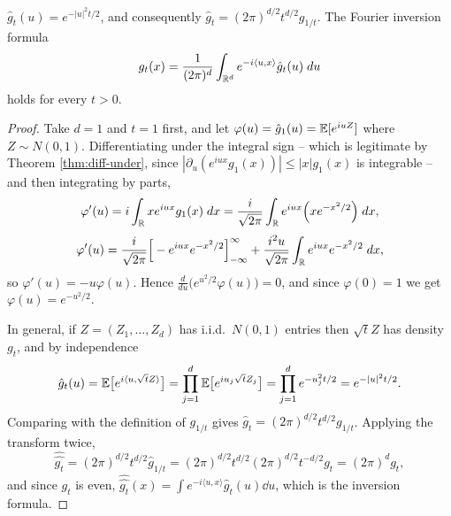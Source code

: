\documentclass[a4paper]{scrartcl}
\newcommand{\ip}[2]{\langle #1, #2 \rangle}
\begin{document}
\begin{proposition}\label{prop:gauss-ft}
	$\hat g_t(u) = e^{-|u|^2 t/2}$, and consequently $\hat g_t = (2\pi)^{d/2}t^{d/2}g_{1/t}$. The Fourier inversion formula
	$$
	g_t(x) = \frac{1}{(2\pi)^d}\int_{\R^d}e^{-i\ip{u}{x}}\hat g_t(u)\dd u
	$$
	holds for every $t>0$.
\end{proposition}
\begin{proof}
	Take $d=1$ and $t=1$ first, and let $\varphi(u)=\hat g_1(u)=\mathbb{E}[e^{iuZ}]$ where $Z \sim N(0,1)$. Differentiating under the integral sign -- which is legitimate by Theorem \ref{thm:diff-under}, since $|\partial_u(e^{iux}g_1(x))| \leq |x|g_1(x)$ is integrable -- and then integrating by parts,
	$$
	\varphi'(u) = i\int_{\mathbb{R}} x e^{iux}g_1(x)\; d x = \frac{i}{\sqrt{2\pi}}\int_{\mathbb{R}} e^{iux}\Big(x e^{-x^2/2}\Big)\; d x,
	$$
	$$
	\varphi'(u) = \frac{i}{\sqrt{2\pi}}\Big[ -e^{iux}e^{-x^2/2}\Big]_{-\infty}^\infty + \frac{i^2 u}{\sqrt{2\pi}}\int_{\mathbb{R}} e^{iux}e^{-x^2/2}\; d x,
	$$
	so $\varphi'(u)=-u\varphi(u)$. Hence $\frac{d}{du}\big(e^{u^2/2}\varphi(u)\big)=0$, and since $\varphi(0)=1$ we get $\varphi(u)=e^{-u^2/2}$.

	In general, if $Z=(Z_1,\dots,Z_d)$ has i.i.d.\ $N(0,1)$ entries then $\sqrt t Z$ has density $g_t$, and by independence
	$$
	\hat g_t(u) = \EE\big[e^{i\ip{u}{\sqrt tZ}}\big] = \prod_{j=1}^d\EE\big[e^{iu_j\sqrt t Z_j}\big]=\prod_{j=1}^d e^{-u_j^2t/2}=e^{-|u|^2t/2}.
	$$
	Comparing with the definition of $g_{1/t}$ gives $\hat g_t = (2\pi)^{d/2}t^{d/2}g_{1/t}$. Applying the transform twice,
	$$
	\hat{\hat{g_t}} = (2\pi)^{d/2}t^{d/2}\hat g_{1/t} = (2\pi)^{d/2}t^{d/2}(2\pi)^{d/2}t^{-d/2}g_t = (2\pi)^d g_t,
	$$
	and since $g_t$ is even, $\hat{\hat{g_t}}(x) = \int e^{-i\ip{u}{x}}\hat g_t(u)\dd u$, which is the inversion formula.
\end{proof}
\end{document}
